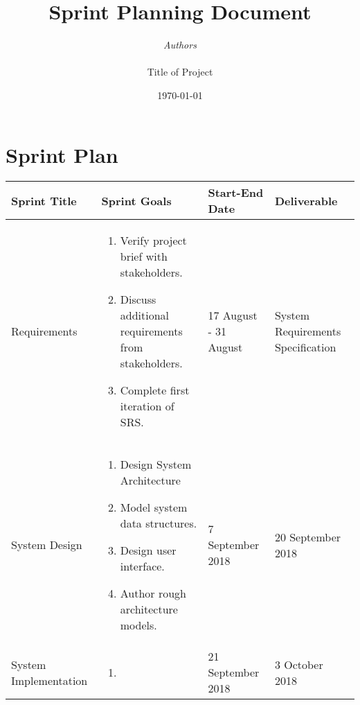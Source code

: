 \documentclass[11pt]{article}
\begin{document}

\thispagestyle{empty}
\title{{\LARGE\bf Sprint Planning Document}}
\author{{\Large\it Authors} \\
\vspace*{2.5in} 
\mbox{} \\
{\Large Title of Project}
\vspace*{2.5in} 
\mbox{} \\
\date{\today}
}
\maketitle


%

\section{Sprint Plan}


	

\begin{table}[H]
	\hskip-4.0cm\begin{tabular}[\textwidth]{@{}|l|l|l|l|@{}}
		\toprule
		Sprint Title & Sprint Goals & Start-End Date & Deliverable \\ \midrule
		Requirements & \begin{minipage}{0.3\textwidth}
		\begin{enumerate}[leftmargin= 0.1\textwidth]
			\item Verify project brief with stakeholders.
			\item Discuss additional requirements from stakeholders.
			\item Complete first iteration of SRS.
		\end{enumerate}
		\end{minipage}& 17 August - 31 August & System Requirements Specification \\ \midrule
	System Design	&  \begin{minipage}{0.3\textwidth}
		\begin{enumerate}[leftmargin= 0.1\textwidth]
			\item Design System Architecture
			\item Model system data structures.
			\item Design user interface.
			\item Author rough architecture models.
		\end{enumerate}
	\end{minipage} & 7 September 2018 & 20 September 2018 \\ \midrule
	System Implementation  &\begin{minipage}{0.3\textwidth}
		\begin{enumerate}[leftmargin= 0.1\textwidth]
			\item  
		\end{enumerate}
	\end{minipage}  & 21 September 2018 & 3 October 2018 \\ \bottomrule
	\end{tabular}
\end{table}
\end{document}
